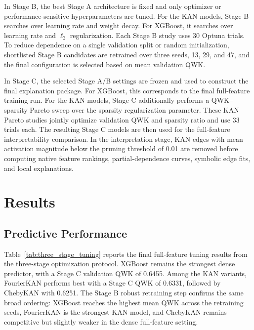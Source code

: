 \documentclass{article}
\begin{document}
In Stage B, the best Stage A architecture is fixed and only optimizer or performance-sensitive hyperparameters are tuned. For the KAN models, Stage B searches over learning rate and weight decay. For XGBoost, it searches over learning rate and $\ell_2$ regularization. Each Stage B study uses 30 Optuna trials. To reduce dependence on a single validation split or random initialization, shortlisted Stage B candidates are retrained over three seeds, 13, 29, and 47, and the final configuration is selected based on mean validation QWK.

In Stage C, the selected Stage A/B settings are frozen and used to construct the final explanation package. For XGBoost, this corresponds to the final full-feature training run. For the KAN models, Stage C additionally performs a QWK--sparsity Pareto sweep over the sparsity regularization parameter. These KAN Pareto studies jointly optimize validation QWK and sparsity ratio and use 33 trials each. The resulting Stage C models are then used for the full-feature interpretability comparison. In the interpretation stage, KAN edges with mean activation magnitude below the pruning threshold of 0.01 are removed before computing native feature rankings, partial-dependence curves, symbolic edge fits, and local explanations.

\section{Results}
\label{sec:results}

\subsection{Predictive Performance}
\label{sec:results_optuna}

Table~\ref{tab:three_stage_tuning} reports the final full-feature tuning results from the three-stage optimization protocol. XGBoost remains the strongest dense predictor, with a Stage C validation QWK of 0.6455. Among the KAN variants, FourierKAN performs best with a Stage C QWK of 0.6331, followed by ChebyKAN with 0.6251. The Stage B robust retraining step confirms the same broad ordering: XGBoost reaches the highest mean QWK across the retraining seeds, FourierKAN is the strongest KAN model, and ChebyKAN remains competitive but slightly weaker in the dense full-feature setting.
\end{document}
